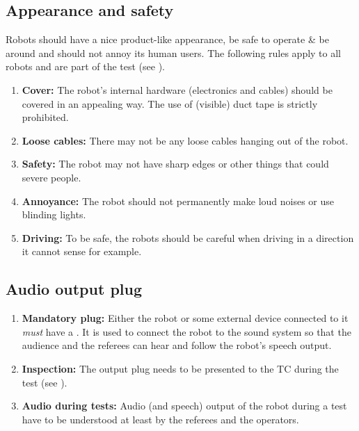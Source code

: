 \subsection{Appearance and safety}
\label{rule:roobt_appearance}

Robots should have a nice product-like appearance, be safe to operate \& be around and should not annoy its human users. The following rules apply to all robots and are part of the  test (see ). 
\begin{enumerate}
	\item \textbf{Cover:} The robot's internal hardware (electronics and cables) should be covered in an appealing way. The use of (visible) duct tape is strictly prohibited.
	\item \textbf{Loose cables:} There may not be any loose cables hanging out of the robot. 
	\item \textbf{Safety:} The robot may not have sharp edges or other things that could severe people.
	\item \textbf{Annoyance:} The robot should not permanently make loud noises or use blinding lights.
	\item \textbf{Driving:} To be safe, the robots should be careful when driving in a direction it cannot sense for example. 
\end{enumerate}




\subsection{Audio output plug}\label{rule:roobt_audio_out}

\begin{enumerate}
	\item \textbf{Mandatory plug:} Either the robot or some external device connected to it \emph{must} have a . It is used to connect the robot to the sound system so that the audience and the referees can hear and follow the robot's speech output.
	\item \textbf{Inspection:} The output plug needs to be presented to the TC during the  test (see ).
	\item \textbf{Audio during tests:} Audio (and speech) output of the robot during a test have to be understood at least by the referees and the operators.
\end{enumerate}


